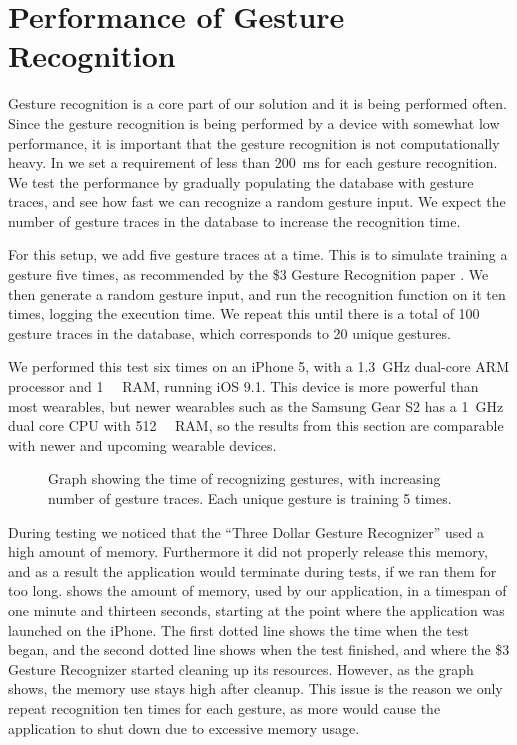 \section{Performance of Gesture Recognition}\label{sec:gestureperformance}
Gesture recognition is a core part of our solution and it is being performed often. 
Since the gesture recognition is being performed by a device with somewhat low performance,
it is important that the gesture recognition is not computationally heavy.
In  we set a requirement of less than \SI{200}{\milli\second} for each gesture recognition.
We test the performance by gradually populating the database with gesture traces, 
and see how fast we can recognize a random gesture input.
We expect the number of gesture traces in the database to increase the recognition time.

For this setup, we add five gesture traces at a time. 
This is to simulate training a gesture five times, 
as recommended by the \$3 Gesture Recognition paper \cite{threedollar}. 
We then generate a random gesture input, 
and run the recognition function on it ten times, 
logging the execution time.
We repeat this until there is a total of \num{100} gesture traces in the database, 
which corresponds to \num{20} unique gestures.

We performed this test six times on an iPhone 5, 
with a \SI{1.3}{\giga\hertz} dual-core ARM processor and \SI{1}{\giga\byte} RAM, running iOS 9.1.
This device is more powerful than most wearables, 
but newer wearables such as the Samsung Gear S2 has a \SI{1}{\giga\hertz} dual core CPU with \SI{512}{\mega\byte} RAM, 
so the results from this section are comparable with newer and upcoming wearable devices.

\begin{figure}[!htb]
    \centering
    
    \caption{Graph showing the time of recognizing gestures, with increasing number of gesture traces. Each unique gesture is training \num{5} times.}
    \label{fig:performancegraph}
\end{figure}

During testing we noticed that the ``Three Dollar Gesture Recognizer'' used a high amount of memory. 
Furthermore it did not properly release this memory, 
and as a result the application would terminate during tests, 
if we ran them for too long.
 shows the amount of memory, 
used by our application, 
in a timespan of one minute and thirteen seconds, 
starting at the point where the application was launched on the iPhone. 
The first dotted line shows the time when the test began, 
and the second dotted line shows when the test finished, 
and where the \$3 Gesture Recognizer started cleaning up its resources.
However, as the graph shows, the memory use stays high after cleanup. %
This issue is the reason we only repeat recognition ten times for each gesture, 
as more would cause the application to shut down due to excessive memory usage. %

